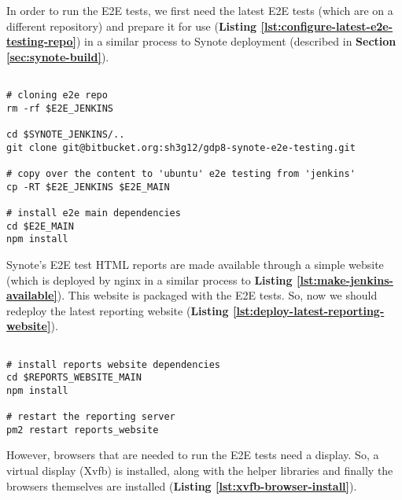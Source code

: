 In order to run the E2E tests, we first need the latest E2E tests (which are on a different repository) and prepare it for use (\textbf{Listing \ref{lst:configure-latest-e2e-testing-repo}}) in a similar process to Synote deployment (described in \textbf{Section \ref{sec:synote-build}}).

\begin{listing}[H]
\begin{verbatim}

# cloning e2e repo
rm -rf $E2E_JENKINS

cd $SYNOTE_JENKINS/..
git clone git@bitbucket.org:sh3g12/gdp8-synote-e2e-testing.git

# copy over the content to 'ubuntu' e2e testing from 'jenkins'
cp -RT $E2E_JENKINS $E2E_MAIN

# install e2e main dependencies
cd $E2E_MAIN
npm install

\end{verbatim}
\label{lst:configure-latest-e2e-testing-repo}
\end{listing}

Synote's E2E test HTML reports are made available through a simple website (which is deployed by nginx in a similar process to \textbf{Listing \ref{lst:make-jenkins-available}}). This website is packaged with the E2E tests. So, now we should redeploy the latest reporting website (\textbf{Listing \ref{lst:deploy-latest-reporting-website}}).

\begin{listing}[H]
\begin{verbatim}

# install reports website dependencies
cd $REPORTS_WEBSITE_MAIN
npm install

# restart the reporting server
pm2 restart reports_website

\end{verbatim}
\label{lst:deploy-latest-reporting-website}
\end{listing}

However, browsers that are needed to run the E2E tests need a display. So, a virtual display (Xvfb) is installed, along with the helper libraries and finally the browsers themselves are installed (\textbf{Listing \ref{lst:xvfb-browser-install}}).

